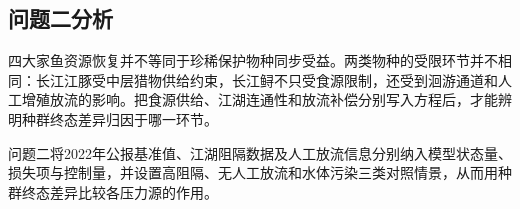 \subsection{问题二分析}
四大家鱼资源恢复并不等同于珍稀保护物种同步受益。两类物种的受限环节并不相同：长江江豚受中层猎物供给约束，长江鲟不只受食源限制，还受到洄游通道和人工增殖放流的影响。把食源供给、江湖连通性和放流补偿分别写入方程后，才能辨明种群终态差异归因于哪一环节。

问题二将2022年公报基准值、江湖阻隔数据及人工放流信息分别纳入模型状态量、损失项与控制量，并设置高阻隔、无人工放流和水体污染三类对照情景，从而用种群终态差异比较各压力源的作用。

